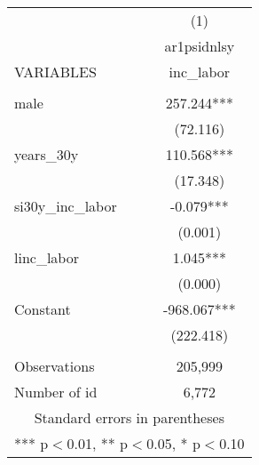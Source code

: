 \begin{tabular}{lc} \hline
 & (1) \\
 & ar1psidnlsy \\
VARIABLES & inc\_labor \\ \hline
 &  \\
male & 257.244*** \\
 & (72.116) \\
years\_30y & 110.568*** \\
 & (17.348) \\
si30y\_inc\_labor & -0.079*** \\
 & (0.001) \\
linc\_labor & 1.045*** \\
 & (0.000) \\
Constant & -968.067*** \\
 & (222.418) \\
 &  \\
Observations & 205,999 \\
 Number of id & 6,772 \\ \hline
\multicolumn{2}{c}{ Standard errors in parentheses} \\
\multicolumn{2}{c}{ *** p$<$0.01, ** p$<$0.05, * p$<$0.10} \\
\end{tabular}
